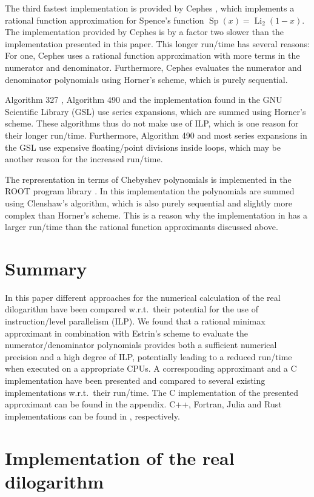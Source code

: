 \documentclass[10pt,DIV=16,twocolumn,numbers=noenddot]{scrartcl}
\newcommand{\Li}{\operatorname{Li}_2}
\begin{document}
The third fastest implementation is provided by Cephes \cite{cephes},
which implements a rational function approximation for Spence's
function $\operatorname{Sp}(x)=\Li(1-x)$.  The implementation provided
by Cephes is by a factor two slower than the implementation presented
in this paper.  This longer run\-/time has several reasons: For one,
Cephes uses a rational function approximation with more terms in the
numerator and denominator.  Furthermore, Cephes evaluates the
numerator and denominator polynomials using Horner's scheme, which is
purely sequential.%

Algorithm 327 \cite{koelbigDilog}, Algorithm 490 \cite{ginsberg} and
the implementation found in the GNU Scientific Library (GSL)
\cite{gsl} use series expansions, which are summed using Horner's
scheme.  These algorithms thus do not make use of ILP, which is one
reason for their longer run\-/time.  Furthermore, Algorithm 490 and
most series expansions in the GSL use expensive floating\-/point
divisions inside loops, which may be another reason for the increased
run\-/time.

The representation in terms of Chebyshev polynomials \cite{luke} is
implemented in the ROOT program library \cite{root}.  In this
implementation the polynomials are summed using Clenshaw's algorithm,
which is also purely sequential and slightly more complex than
Horner's scheme.  This is a reason why the implementation in
\cite{root} has a larger run\-/time than the rational function
approximants discussed above.

\section{Summary}

In this paper different approaches for the numerical calculation of
the real dilogarithm have been compared w.r.t.\ their potential for
the use of instruction\-/level parallelism (ILP).  We found that a
rational minimax approximant in combination with Estrin's scheme to
evaluate the numerator/denominator polynomials provides both a
sufficient numerical precision and a high degree of ILP, potentially
leading to a reduced run\-/time when executed on a appropriate CPUs.
A corresponding approximant and a C implementation have been presented
and compared to several existing implementations w.r.t.\ their
run\-/time.  The C implementation of the presented approximant can be
found in the appendix.  C++, Fortran, Julia and Rust implementations
can be found in \cite{polylogarithm,PolyLog.jl,polylog}, respectively.

\appendix

\section{Implementation of the real dilogarithm}



\printbibliography
\end{document}
